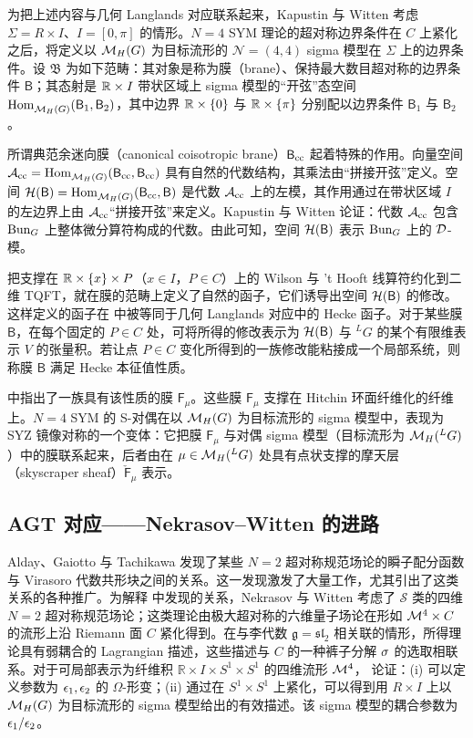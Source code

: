 为把上述内容与几何 Langlands 对应联系起来，Kapustin 与 Witten 考虑 $\Sigma=R\times I$、$I=[0,\pi]$ 的情形。$N=4$ SYM 理论的超对称边界条件在 $C$ 上紧化之后，将定义以 $\mathcal{M}_H(G)$ 为目标流形的 $\mathcal{N}=(4,4)$ sigma 模型在 $\Sigma$ 上的边界条件。设 $\mathfrak{B}$ 为如下范畴：其对象是称为膜（brane）、保持最大数目超对称的边界条件 $\mathsf{B}$；其态射是 $\mathbb{R}\times I$ 带状区域上 sigma 模型的“开弦”态空间 ${\rm Hom}_{\mathcal{M}_H(G)}^{}(\mathsf{B}_1,\mathsf{B}_2)$，其中边界 $\mathbb{R}\times \{0\}$ 与 $\mathbb{R}\times \{\pi\}$ 分别配以边界条件 $\mathsf{B}_1$ 与 $\mathsf{B}_2$。

所谓典范余迷向膜（canonical coisotropic brane）$\mathsf{B}_{\rm cc}$ 起着特殊的作用\cite{KW,NW}。向量空间 $\mathcal{A}_{\rm cc}={\rm Hom}_{\mathcal{M}_H(G)}^{}(\mathsf{B}_{\rm cc},\mathsf{B}_{\rm cc})$ 具有自然的代数结构，其乘法由“拼接开弦”定义。空间 $\mathcal{H}(\mathsf{B})={\rm Hom}_{\mathcal{M}_H(G)}^{}(\mathsf{B}_{\rm cc},\mathsf{B})$ 是代数 $\mathcal{A}_{\rm cc}$ 上的左模，其作用通过在带状区域 $I$ 的左边界上由 $\mathcal{A}_{\rm cc}$“拼接开弦”来定义。Kapustin 与 Witten 论证：代数 $\mathcal{A}_{\rm cc}$ 包含 $\operatorname{Bun}_G$ 上整体微分算符构成的代数。由此可知，空间 $\mathcal{H}(\mathsf{B})$ 表示 $\operatorname{Bun}_G$ 上的 $\mathcal{D}$-模。

把支撑在 $\mathbb{R}\times\{x\}\times P$（$x\in I$，$P\in C$）上的 Wilson 与 't Hooft 线算符约化到二维 TQFT，就在膜的范畴上定义了自然的函子，它们诱导出空间 $\mathcal{H}(\mathsf{B})$ 的修改。这样定义的函子在 \cite{KW} 中被等同于几何 Langlands 对应中的 Hecke 函子。对于某些膜 $\mathsf{B}$，在每个固定的 $P\in C$ 处，可将所得的修改表示为 $\mathcal{H}(\mathsf{B})$ 与 ${}^{L}G$ 的某个有限维表示 $V$ 的张量积。若让点 $P\in C$ 变化所得到的一族修改能粘接成一个局部系统，则称膜 $\mathsf{B}$ 满足 Hecke 本征值性质。

\cite{KW} 中指出了一族具有该性质的膜 $\mathsf{F}_\mu$。这些膜 $\mathsf{F}_\mu$ 支撑在 Hitchin 环面纤维化的纤维上。$N=4$ SYM 的 S-对偶在以 $\mathcal{M}_H(G)$ 为目标流形的 sigma 模型中，表现为 SYZ 镜像对称的一个变体：它把膜 $\mathsf{F}_\mu$ 与对偶 sigma 模型（目标流形为 $\mathcal{M}_H({}^{L}G)$）中的膜联系起来，后者由在 $\mu\in\mathcal{M}_H({}^{L}G)$ 处具有点状支撑的摩天层（skyscraper sheaf）$\check{\mathsf{F}}_\mu$ 表示。

\subsection{AGT 对应——Nekrasov--Witten 的进路}

Alday、Gaiotto 与 Tachikawa 发现了某些 $N=2$ 超对称规范场论的瞬子配分函数与 Virasoro 代数共形块之间的关系\cite{AGT}。这一发现激发了大量工作，尤其引出了这类关系的各种推广。为解释 \cite{AGT} 中发现的关系，Nekrasov 与 Witten 考虑了 $\mathcal{S}$ 类的四维 $N=2$ 超对称规范场论；这类理论由极大超对称的六维量子场论在形如 $\mathcal{M}^4\times C$ 的流形上沿 Riemann 面 $C$ 紧化得到。在与李代数 $\mathfrak{g}=\mathfrak{sl}_2$ 相关联的情形，所得理论具有弱耦合的 Lagrangian 描述，这些描述与 $C$ 的一种裤子分解 $\sigma$ 的选取相联系。对于可局部表示为纤维积 $\mathbb{R}\times I\times S^1\times S^1$ 的四维流形 $\mathcal{M}^4$，\cite{NW} 论证：(i) 可以定义参数为 $\epsilon_1,\epsilon_2$ 的 $\Omega$-形变；(ii) 通过在 $S^1\times S^1$ 上紧化，可以得到用 $R\times I$ 上以 $\mathcal{M}_H(G)$ 为目标流形的 sigma 模型给出的有效描述。该 sigma 模型的耦合参数为 $\epsilon_1/\epsilon_2$。

